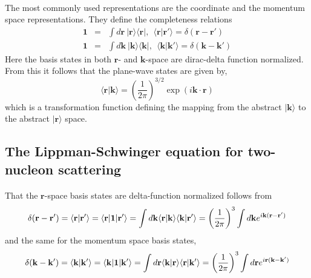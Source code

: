 \documentclass[%
twoside,                 %
final,                   %
10pt]{article}
\begin{document}
\paragraph{}
The most commonly used representations are the coordinate and
the momentum space representations. They define the completeness relations 
\begin{eqnarray*}
 \mathbf{1}&=&  \int d\mathbf{r} \:\vert\mathbf{r} \rangle \langle \mathbf{r}\vert, \:\: \langle  \mathbf{r}\vert  \mathbf{r'} \rangle = \delta ( \mathbf{r}-\mathbf{r'}) \\
\mathbf{1} &=& \int d\mathbf{k} \:\vert  \mathbf{k}\rangle \langle \mathbf{k}\vert, \:\: \langle\mathbf{k}\vert  \mathbf{k'} \rangle = \delta ( \mathbf{k}-\mathbf{k'}) 
\end{eqnarray*}
Here the basis states in  both $\mathbf{r}$- and $\mathbf{k}$-space are dirac-delta 
function normalized. From this it follows that the plane-wave states are given by,
\[
\langle\mathbf{r}\vert\mathbf{k} \rangle =\left(\frac{1}{2\pi}\right)^{3/2}\exp\left(i\mathbf{k\cdot r} \right)
\]
which is a transformation function defining the mapping from the abstract 
$\vert\mathbf{k}\rangle$ to the abstract $\vert\mathbf{r}\rangle $ space.



\subsection*{The Lippman-Schwinger equation for two-nucleon scattering}

\paragraph{}
That the $\mathbf{r}$-space basis states are 
delta-function normalized follows from 
\[
\delta ( \mathbf{r}-\mathbf{r'}) = \langle \mathbf{r} \vert \mathbf{r}'\rangle = \langle \mathbf{r} \vert \mathbf{1} \vert \mathbf{r}'\rangle = \int d\mathbf{k} \langle \mathbf{r}\vert \mathbf{k} \rangle \langle \mathbf{k}\vert \mathbf{r}' \rangle =\left( {1\over 2\pi}\right)^3 \int d\mathbf{k} e^{i \mathbf{k}(\mathbf{r} - \mathbf{r}')} 
\]
and the same for the momentum space basis states,
\[
\delta ( \mathbf{k}-\mathbf{k'}) = \langle \mathbf{k} \vert \mathbf{k}'\rangle = \langle \mathbf{k} \vert \mathbf{1} \vert \mathbf{k}'\rangle =\int d\mathbf{r} \langle \mathbf{k}\vert \mathbf{r} \rangle \langle \mathbf{r}\vert \mathbf{k}' \rangle = \left( {1\over 2\pi}\right)^3 \int d\mathbf{r} e^{i \mathbf{r}(\mathbf{k} - \mathbf{k}')} 
\]
\end{document}
